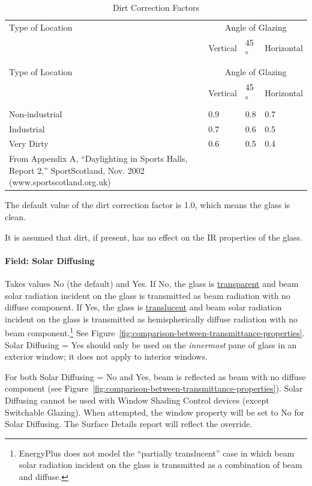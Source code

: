 \begin{longtable}[c]{@{}llll@{}}
\caption{Dirt Correction Factors \label{table:dirt-correction-factors}} \\
\toprule
Type of Location & \multicolumn{3}{c}{Angle of Glazing} \\ \cmidrule(r){2-4}
                 & Vertical & 45$^{o}$ & Horizontal \\ \midrule
\endfirsthead

\caption[]{Dirt Correction Factors} \\
\toprule
Type of Location & \multicolumn{3}{c}{Angle of Glazing} \\ \cmidrule(r){2-4}
                 & Vertical & 45$^{o}$ & Horizontal \\ \midrule
\endhead

Non-industrial & 0.9 & 0.8 & 0.7 \\
Industrial & 0.7 & 0.6 & 0.5 \\
Very Dirty & 0.6 & 0.5 & 0.4 \\
\bottomrule
{\tiny From Appendix A, ``Daylighting in Sports Halls, Report 2,'' SportScotland, Nov. 2002 (www.sportscotland.org.uk)}
\end{longtable}

The default value of the dirt correction factor is 1.0, which means the glass is clean.

It is assumed that dirt, if present, has no effect on the IR properties of the glass.

\paragraph{Field: Solar Diffusing}\label{field-solar-diffusing}

Takes values No (the default) and Yes. If No, the glass is \underline{transparent} and beam solar radiation incident on the glass is transmitted as beam radiation with no diffuse component. If Yes, the glass is \underline{translucent} and beam solar radiation incident on the glass is transmitted as hemispherically diffuse radiation with no beam component.\footnote{EnergyPlus does not model the ``partially translucent'' case in which beam solar radiation incident on the glass is transmitted as a combination of beam and diffuse.} See Figure~\ref{fig:comparison-between-transmittance-properties}. Solar Diffusing = Yes should only be used on the \emph{innermost} pane of glass in an exterior window; it does not apply to interior windows.

For both Solar Diffusing = No and Yes, beam is reflected as beam with no diffuse component (see Figure~\ref{fig:comparison-between-transmittance-properties}). Solar Diffusing cannot be used with Window Shading Control devices (except Switchable Glazing). When attempted, the window property will be set to No for Solar Diffusing. The Surface Details report will reflect the override.

